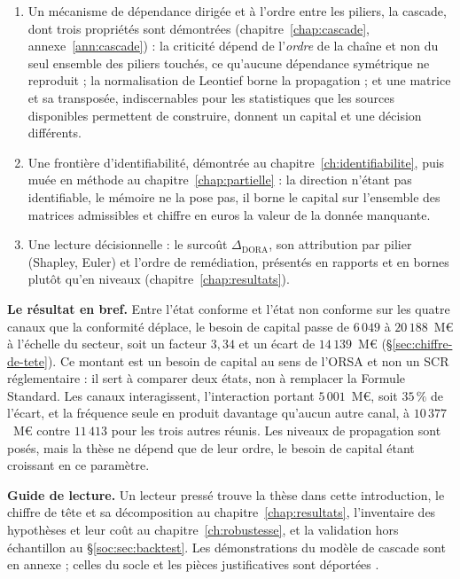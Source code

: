 \begin{enumerate}[leftmargin=1.4em,itemsep=3pt]
\item Un mécanisme de dépendance dirigée et à l'ordre entre les piliers, la cascade,
      dont trois propriétés sont démontrées (chapitre~\ref{chap:cascade},
      annexe~\ref{ann:cascade}) :
      la criticité dépend de l'\emph{ordre} de la chaîne et non du seul ensemble des piliers
      touchés, ce qu'aucune dépendance symétrique ne reproduit ; la normalisation de Leontief
      borne la propagation ; et une matrice et sa transposée, indiscernables pour les
      statistiques que les sources disponibles permettent de construire, donnent un capital et
      une décision différents.
\item Une frontière d'identifiabilité, démontrée au
      chapitre~\ref{ch:identifiabilite}, puis muée en méthode au
      chapitre~\ref{chap:partielle} : la direction n'étant pas
      identifiable, le mémoire ne la pose pas, il borne le capital sur l'ensemble des matrices
      admissibles et chiffre en euros la valeur de la donnée manquante.
\item Une lecture décisionnelle : le surcoût $\Delta_{\text{DORA}}$, son attribution
      par pilier (Shapley, Euler) et l'ordre de remédiation, présentés en rapports et en
      bornes plutôt qu'en niveaux (chapitre~\ref{chap:resultats}).
\end{enumerate}

\begin{cle}
\textbf{Le résultat en bref.} Entre l'état conforme et l'état non conforme sur les quatre canaux
que la conformité déplace, le besoin de capital passe de $6\,049$ à $20\,188$~M\euro{} à
l'échelle du secteur, soit un facteur $3{,}34$ et un écart de $14\,139$~M\euro{}
(\S\ref{sec:chiffre-de-tete}). Ce montant est un besoin de capital au sens de l'ORSA et non un
SCR réglementaire : il sert à comparer deux états, non à remplacer la Formule Standard. Les
canaux interagissent, l'interaction portant $5\,001$~M\euro{}, soit $35\,\%$ de l'écart, et la
fréquence seule en produit davantage qu'aucun autre canal, à $10\,377$~M\euro{} contre
$11\,413$ pour les trois autres réunis. Les niveaux de propagation sont posés, mais la thèse ne
dépend que de leur ordre, le besoin de capital étant croissant en ce paramètre.

\textbf{Guide de lecture.} Un lecteur pressé trouve la thèse dans cette introduction, le chiffre
de tête et sa décomposition au chapitre~\ref{chap:resultats}, l'inventaire des hypothèses et
leur coût au chapitre~\ref{ch:robustesse}, et la validation hors échantillon au
\S\ref{soc:sec:backtest}. Les démonstrations du modèle de cascade sont en annexe ; celles du
socle et les pièces justificatives sont déportées \matcomp.
\end{cle}

